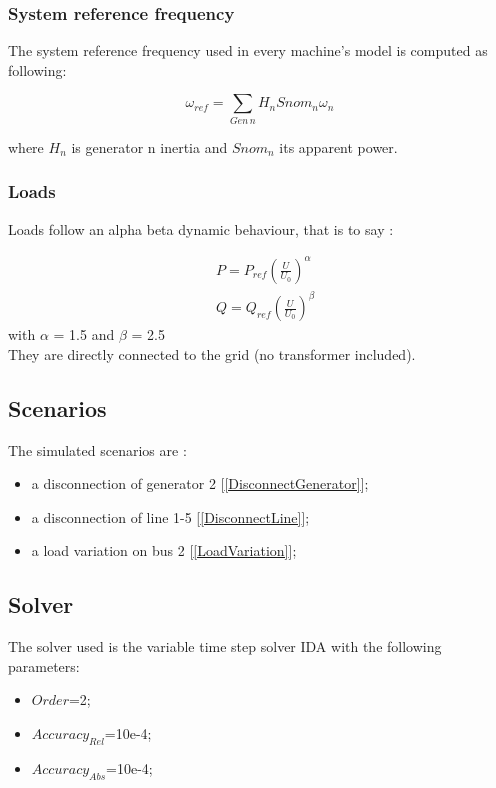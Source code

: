 \documentclass[a4paper, 12pt]{report}
\begin{document}
\subsubsection{System reference frequency}

The system reference frequency used in every machine's model is computed as following:

\[
 \omega_{ref} = \sum_{Gen \hspace{2pt} n} H_{n} Snom_{n} \omega_{n}
\]

where $H_{n}$ is generator n inertia and $Snom_{n}$ its apparent power.
\subsubsection{Loads}

Loads follow an alpha beta dynamic behaviour, that is to say :

\[
\begin{aligned}
& P = P_{ref} (\frac{U}{U_{0}})^\alpha \\
& Q = Q_{ref} (\frac{U}{U_{0}})^\beta
\end{aligned}
\]
with $\alpha$ = 1.5 and $\beta$ = 2.5 \\
They are directly connected to the grid (no transformer included).


\subsection{Scenarios}
The simulated scenarios are :
\begin{itemize}
\item a disconnection of generator 2 [\ref{DisconnectGenerator}];
\item a disconnection of line 1-5 [\ref{DisconnectLine}];
\item a load variation on bus 2 [\ref{LoadVariation}];
\end{itemize}

\subsection{Solver}
The solver used is the variable time step solver IDA with the following parameters:
\begin{itemize}
\item $Order$=2;
\item $Accuracy_{Rel}$=10e-4;
\item $Accuracy_{Abs}$=10e-4;
\end{itemize}
\end{document}
